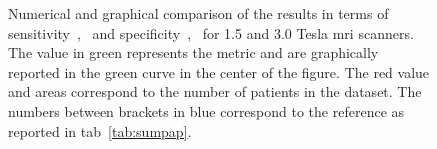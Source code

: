 \begin{figure}
{\begin{tikzpicture}[scale=.48,every node/.style={scale=0.48}]
    \end{tikzpicture}
  }
  \hspace*{\fill}
  \caption{Numerical and graphical comparison of the results in terms of sensitivity~,~ and specificity~,~ for 1.5 and 3.0 Tesla \ac{mri} scanners. The value in {\color{semiAuto}green} represents the metric and are graphically reported in the {\color{semiAuto}green} curve in the center of the figure. The {\color{red}red} value and areas correspond to the number of patients in the dataset. The numbers between brackets in {\color{blue}blue} correspond to the reference as reported in \acs{tab}~\ref{tab:sumpap}.}
  \label{fig:sensspec}
\end{figure}
\restoregeometry

